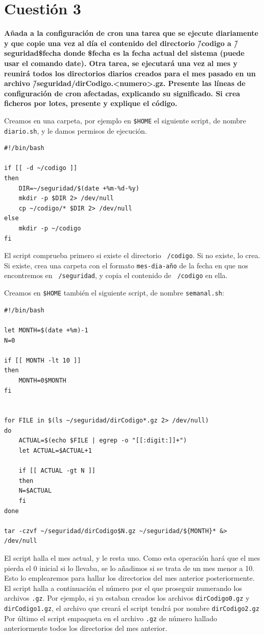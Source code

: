 \documentclass[a4paper,10pt]{article}
\newenvironment{answer}{%
\begin{list}{}{%
}%
\item[]}{\end{list}}
\begin{document}
\section{Cuestión 3}
\textbf{ Añada a la configuración de cron una tarea que se ejecute diariamente y que copie una vez al día el contenido del directorio
\~/codigo a \~/seguridad\$fecha donde \$fecha es la fecha actual del sistema (puede usar el comando
date). Otra tarea, se ejecutará una vez al mes y reunirá todos los directorios diarios creados para el mes pasado
en un archivo \~/seguridad/dirCodigo.<numero>.gz. Presente las líneas de configuración de cron afectadas, explicando
su significado. Si crea ficheros por lotes, presente y explique el código.}
\begin{answer}
 Creamos en una carpeta, por ejemplo en \texttt{\$HOME} el siguiente script, de nombre \texttt{diario.sh}, y le damos permisos de ejecución.
 
\begin{lstlisting}[style=BashInputStyle]
#!/bin/bash

if [[ -d ~/codigo ]]
then
    DIR=~/seguridad/$(date +%m-%d-%y)
    mkdir -p $DIR 2> /dev/null
    cp ~/codigo/* $DIR 2> /dev/null
else
    mkdir -p ~/codigo
fi
\end{lstlisting}
  
  El script comprueba primero si existe el directorio \texttt{~/codigo}. Si no existe, lo crea. Si existe, crea una carpeta
  con el formato \texttt{mes-dia-año} de la fecha en que nos encontremos en \texttt{~/seguridad}, y copia el contenido de \texttt{~/codigo}
  en ella.
  
  Creamos en \texttt{\$HOME} también el siguiente script, de nombre \texttt{semanal.sh}:
  
\begin{lstlisting}[style=BashInputStyle]
#!/bin/bash

let MONTH=$(date +%m)-1
N=0

if [[ MONTH -lt 10 ]]
then
    MONTH=0$MONTH
fi


for FILE in $(ls ~/seguridad/dirCodigo*.gz 2> /dev/null)
do
    ACTUAL=$(echo $FILE | egrep -o "[[:digit:]]+")
    let ACTUAL=$ACTUAL+1
    
    if [[ ACTUAL -gt N ]]
    then
	N=$ACTUAL
    fi
done

tar -czvf ~/seguridad/dirCodigo$N.gz ~/seguridad/${MONTH}* &> /dev/null
\end{lstlisting}
  
  El script halla el mes actual, y le resta uno. Como esta operación hará que el mes pierda el 0 inicial si lo llevaba, se lo añadimos
  si se trata de un mes menor a 10. Esto lo emplearemos para hallar los directorios del mes anterior posteriormente.
  El script halla a continuación el número por el que proseguir numerando los archivos \texttt{.gz}. Por ejemplo, si ya estaban
  creados los archivos \texttt{dirCodigo0.gz} y \texttt{dirCodigo1.gz}, el archivo que creará el script tendrá por nombre \texttt{dirCodigo2.gz}
  Por último el script empaqueta en el archivo \texttt{.gz} de número hallado anteriormente todos los directorios del mes anterior.


\end{answer}
\end{document}
